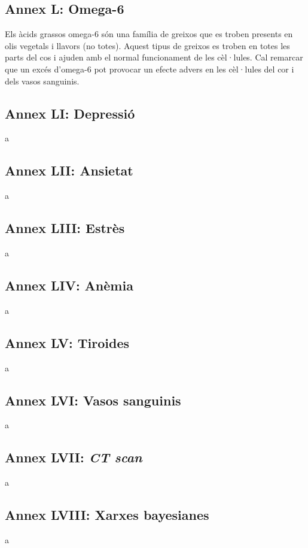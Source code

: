 \documentclass[a4paper,12pt]{article}
\begin{document}
\subsection*{Annex L: Omega-6}
Els àcids grassos omega-6 són una família de greixos que es troben presents en olis vegetals i llavors (no totes). Aquest tipus de greixos es troben en totes les parts del cos i ajuden amb el normal funcionament de les cèl·lules. Cal remarcar que un excés d'omega-6 pot provocar un efecte advers en les cèl·lules del cor i dels vasos sanguinis.
\subsection*{Annex LI: Depressió}
a
\subsection*{Annex LII: Ansietat}
a
\subsection*{Annex LIII: Estrès}
a
\subsection*{Annex LIV: Anèmia}
a
\subsection*{Annex LV: Tiroides}
a
\subsection*{Annex LVI: Vasos sanguinis}
a
\subsection*{Annex LVII: \textit{CT scan}}
a
\subsection*{Annex LVIII: Xarxes bayesianes}
a
\end{document}
